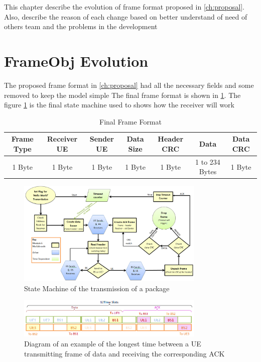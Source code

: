 This chapter describe the evolution of frame format proposed in \ref{ch:proposal}. Also, describe the reason
 of each change based on better understand of need of others team and the problems in the development


\section{FrameObj Evolution}

The proposed frame format in \ref{ch:proposal} had all the necessary fields and some removed to keep the model simple
The final frame format is  shown in \ref{tab:finalFrame}.
The figure \ref{fig:stateMachine} is the final state machine used to shows how the receiver will work

\begin{table}
\begin{tabular}{| c | c | c | c | c | c | c | }
  \hline                       
  Frame Type & Receiver UE & Sender UE & Data Size & Header CRC & Data & Data CRC\\
  \hline
	1 Byte & 1 Byte & 1 Byte & 1 Byte & 1 Byte & 1 to 234 Bytes & 1 Byte\\
  
  \hline  
\end{tabular}
 \caption{Final Frame Format}
	\label{tab:finalFrame}
\end{table}

\begin{figure}[p]
    \centering
    \includegraphics[width=0.8\textwidth]{State_Machine_yellow.PNG}
    \caption{State Machine of the transmission of a package }
    \label{fig:stateMachine}
\end{figure}

\begin{figure}[p]
    \centering
    \includegraphics[width=0.8\textwidth]{ACK_timeout_long.PNG}
    \caption{Diagram of an example of the longest time between a UE transmitting frame of data and receiving the corresponding ACK}
    \label{fig:ACKtimelong}
\end{figure}


